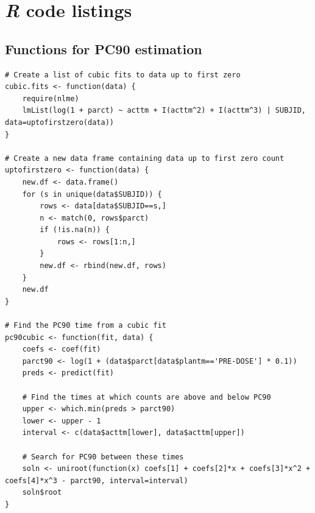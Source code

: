 \chapter{\emph{R} code listings}
\lstset{numberstyle=\small,
frame=single,
framesep=6pt,
tabsize=2,
basicstyle=\small\ttfamily,
showstringspaces=false,
columns = fullflexible,
language=R,
breaklines=true,
showstringspaces=false,
lineskip=-1pt}

\section{Functions for PC90 estimation}
\begin{lstlisting}[float=h,caption=Functions to find PC90 by cubic regression,label=R:cubics]
# Create a list of cubic fits to data up to first zero
cubic.fits <- function(data) {
	require(nlme)
	lmList(log(1 + parct) ~ acttm + I(acttm^2) + I(acttm^3) | SUBJID, data=uptofirstzero(data))
}

# Create a new data frame containing data up to first zero count
uptofirstzero <- function(data) {
	new.df <- data.frame()
	for (s in unique(data$SUBJID)) {
		rows <- data[data$SUBJID==s,]
		n <- match(0, rows$parct)
		if (!is.na(n)) {
			rows <- rows[1:n,]
		}
		new.df <- rbind(new.df, rows)
	}
	new.df
}

# Find the PC90 time from a cubic fit
pc90cubic <- function(fit, data) {
	coefs <- coef(fit)
	parct90 <- log(1 + (data$parct[data$plantm=='PRE-DOSE'] * 0.1))
	preds <- predict(fit)
	
	# Find the times at which counts are above and below PC90 
	upper <- which.min(preds > parct90)
	lower <- upper - 1
	interval <- c(data$acttm[lower], data$acttm[upper])

	# Search for PC90 between these times
	soln <- uniroot(function(x) coefs[1] + coefs[2]*x + coefs[3]*x^2 + coefs[4]*x^3 - parct90, interval=interval)
	soln$root
}
\end{lstlisting}

